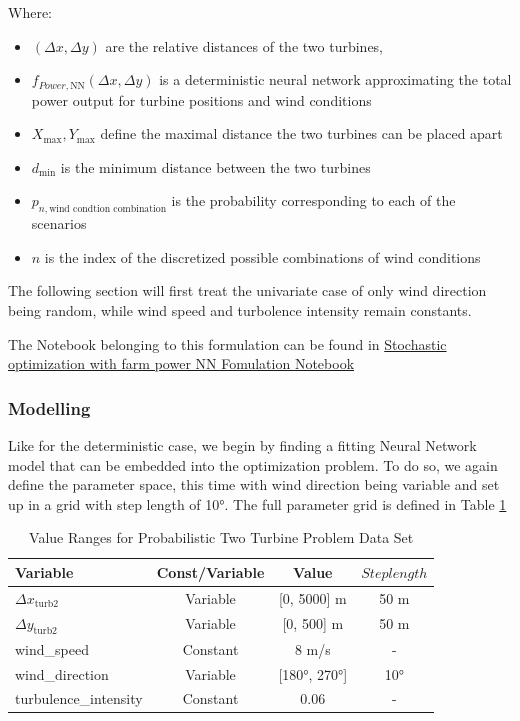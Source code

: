 Where:
\begin{itemize}
	\item \( (\Delta x, \Delta y) \) are the relative distances of the two turbines,
	\item \( f_{Power, \text{NN}}(\Delta x, \Delta y)\) is a deterministic neural network  approximating the total power output for turbine positions and wind conditions
	\item \(  X_{\max}, Y_{\max} \) define the maximal distance the two turbines can be placed apart
	\item \( d_{\min} \) is the minimum distance between the two turbines
	\item \(p_{n, \text{wind condtion combination}}\) is the probability corresponding to each of the scenarios
	\item \( n \) is the index of the discretized possible combinations of wind conditions 
\end{itemize}

The following section will first treat the univariate case of only wind direction being random, while wind speed and turbolence intensity remain constants. 


The Notebook belonging to this formulation can be found in \href{https://github.com/schmeti/uc3m_TFM_wind_farm_optimization_codebase/blob/main/Windfarm_power_modelling/0_two_turbine_problem_constrLearn_probweighted.ipynb}{Stochastic optimization with farm power NN Fomulation Notebook} \cite{schmetz2025twoturbine_stoch1}

\subsubsection{Modelling}

Like for the deterministic case, we begin by finding a fitting Neural Network model that can be embedded into the optimization problem. To do so, we again define the parameter space, this time with wind direction being variable and set up in a grid with step length of 10°. The full parameter grid is defined in Table \ref{tab:val_prob_data}

\begin{table}[ht]
	\centering
	\caption{Value Ranges for Probabilistic Two Turbine Problem Data Set}
	\begin{tabular}{|l|c|c|c|}
		\hline
		\textbf{Variable} & \textbf{Const/Variable} & \textbf{Value} & \textbf{$Steplength$}\\
		\hline
		$\Delta x_{\text{turb2}}$ & Variable & [0, 5000] m & 50 m\\
		$\Delta y_{\text{turb2}}$ & Variable & [0, 500] m  & 50 m\\
		wind\_speed & Constant & 8 m/s & -\\
		wind\_direction & Variable & [180°, 270°]& 10° \\
		turbulence\_intensity & Constant & 0.06 & - \\
		\hline
	\end{tabular}
	\label{tab:val_prob_data}
\end{table}

